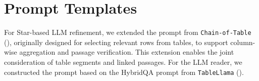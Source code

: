 \section{Prompt Templates}
\label{sec:Prompts}

For Star-based LLM refinement, we extended the prompt from \texttt{Chain-of-Table} (\citealp{chainoftable}), originally designed for selecting relevant rows from tables, to support column-wise aggregation and passage verification. 
This extension enables the joint consideration of table segments and linked passages. 
For the LLM reader, we constructed the prompt based on the HybridQA prompt from \texttt{TableLlama} (\citealp{tablellama}).















\newpage
\newpage


